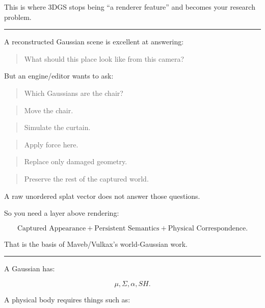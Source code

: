 \hypertarget{06-engine-ii-ch045-captured-worlds-from-appearance-field-to-editable-physical-scene}{}

This is where 3DGS stops being ``a renderer feature'' and becomes your research problem.

\begin{center}\rule{0.5\linewidth}{0.5pt}\end{center}

A reconstructed Gaussian scene is excellent at answering:

\begin{quote}
What should this place look like from this camera?
\end{quote}

But an engine/editor wants to ask:

\begin{quote}
Which Gaussians are the chair?
\end{quote}

\begin{quote}
Move the chair.
\end{quote}

\begin{quote}
Simulate the curtain.
\end{quote}

\begin{quote}
Apply force here.
\end{quote}

\begin{quote}
Replace only damaged geometry.
\end{quote}

\begin{quote}
Preserve the rest of the captured world.
\end{quote}

A raw unordered splat vector does not answer those questions.

So you need a layer above rendering:

\[
\boxed{
\text{Captured Appearance}
+
\text{Persistent Semantics}
+
\text{Physical Correspondence}.
}
\]

That is the basis of Maveb/Vulkax's world-Gaussian work.

\begin{center}\rule{0.5\linewidth}{0.5pt}\end{center}

A Gaussian has:

\[
\mu,
\Sigma,
\alpha,
SH.
\]

A physical body requires things such as:

